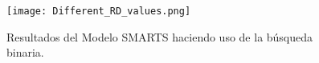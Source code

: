 \begin{frame}
    \vspace{-1cm}
\end{frame}

\begin{frame}
    \begin{figure}[H]
        \renewcommand{\yourowntexcol}{black}
        \centering
        \texttt{[image: Different\_RD\_values.png]}
        \small
        \caption{Resultados del Modelo SMARTS haciendo uso de la búsqueda binaria.}
    \end{figure}
\end{frame}